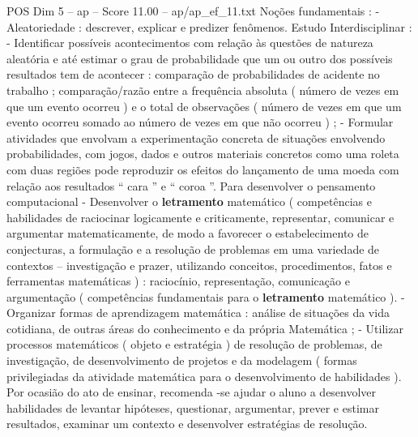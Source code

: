 \begin{textsample}{POS Dim 5 – ap – Score 11.00 – ap/ap\_ef\_11.txt}
Noções fundamentais : - Aleatoriedade : descrever, explicar e predizer fenômenos.
Estudo Interdisciplinar : - Identificar possíveis acontecimentos com relação às questões de natureza aleatória e até estimar o grau de probabilidade que um ou outro dos possíveis resultados tem de acontecer : comparação de probabilidades de acidente no trabalho ; comparação/razão entre a frequência absoluta ( número de vezes em que um evento ocorreu ) e o total de observações ( número de vezes em que um evento ocorreu somado ao número de vezes em que não ocorreu ) ; - Formular atividades que envolvam a experimentação concreta de situações envolvendo probabilidades, com jogos, dados e outros materiais concretos como uma roleta com duas regiões pode reproduzir os efeitos do lançamento de uma moeda com relação aos resultados “ cara ” e “ coroa ”.
Para desenvolver o pensamento computacional - Desenvolver o \textbf{letramento} matemático ( competências e habilidades de raciocinar logicamente e criticamente, representar, comunicar e argumentar matematicamente, de modo a favorecer o estabelecimento de conjecturas, a formulação e a resolução de problemas em uma variedade de contextos – investigação e prazer, utilizando conceitos, procedimentos, fatos e ferramentas matemáticas ) : raciocínio, representação, comunicação e argumentação ( competências fundamentais para o \textbf{letramento} matemático ). - Organizar formas de aprendizagem matemática : análise de situações da vida cotidiana, de outras áreas do conhecimento e da própria Matemática ; - Utilizar processos matemáticos ( objeto e estratégia ) de resolução de problemas, de investigação, de desenvolvimento de projetos e da modelagem ( formas privilegiadas da atividade matemática para o desenvolvimento de habilidades ).
Por ocasião do ato de ensinar, recomenda -se ajudar o aluno a desenvolver habilidades de levantar hipóteses, questionar, argumentar, prever e estimar resultados, examinar um contexto e desenvolver estratégias de resolução.

\end{textsample}
